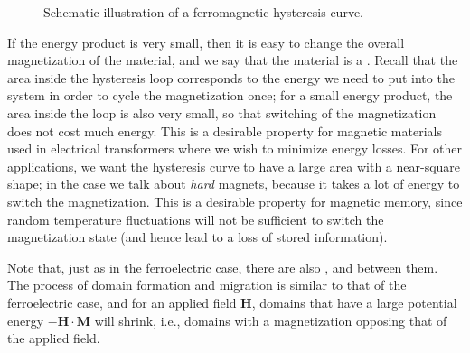 \begin{figure}[h]
\centering\leavevmode
\caption{Schematic illustration of a ferromagnetic hysteresis curve.}
\label{\chabbr:fig:hystmag}
\end{figure}

If the energy product is very small, then it is easy to change the overall magnetization of the material, and we say that the material is a .  Recall that the area inside the hysteresis loop corresponds to the energy we need to put into the system in order to cycle the magnetization once; for a small energy product, the area inside the loop is also very small, so that switching of the magnetization does not cost much energy.  This is a desirable property for magnetic materials used in electrical transformers where we wish to minimize energy losses.  For other applications, we want the hysteresis curve to have a large area with a near-square shape; in the case we talk about \textit{hard} magnets, because it takes a lot of energy to switch the magnetization.  This is a desirable property for magnetic memory, since random temperature fluctuations will not be sufficient to switch the magnetization state (and hence lead to a loss of stored information).


Note that, just as in the ferroelectric case, there are also , and  between them.  The process of domain formation and migration is similar to that of the ferroelectric case, and for an applied field $\mathbf{H}$, domains that have a large potential energy $-\mathbf{H}\cdot\mathbf{M}$ will shrink, i.e., domains with a magnetization opposing that of the applied field.  

